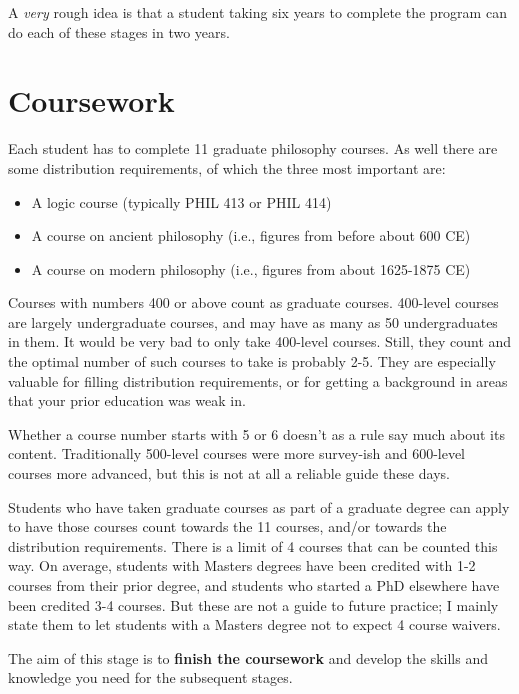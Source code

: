 \documentclass[]{book}
\providecommand{\tightlist}{%
  \setlength{\itemsep}{0pt}\setlength{\parskip}{0pt}}
\begin{document}
A \emph{very} rough idea is that a student taking six years to complete the program can do each of these stages in two years.

\hypertarget{coursework}{%
\section{Coursework}\label{coursework}}

Each student has to complete 11 graduate philosophy courses. As well there are some distribution requirements, of which the three most important are:

\begin{itemize}
\tightlist
\item
  A logic course (typically PHIL 413 or PHIL 414)
\item
  A course on ancient philosophy (i.e., figures from before about 600 CE)
\item
  A course on modern philosophy (i.e., figures from about 1625-1875 CE)
\end{itemize}

Courses with numbers 400 or above count as graduate courses. 400-level courses are largely undergraduate courses, and may have as many as 50 undergraduates in them. It would be very bad to only take 400-level courses. Still, they count and the optimal number of such courses to take is probably 2-5. They are especially valuable for filling distribution requirements, or for getting a background in areas that your prior education was weak in.

Whether a course number starts with 5 or 6 doesn't as a rule say much about its content. Traditionally 500-level courses were more survey-ish and 600-level courses more advanced, but this is not at all a reliable guide these days.

Students who have taken graduate courses as part of a graduate degree can apply to have those courses count towards the 11 courses, and/or towards the distribution requirements. There is a limit of 4 courses that can be counted this way. On average, students with Masters degrees have been credited with 1-2 courses from their prior degree, and students who started a PhD elsewhere have been credited 3-4 courses. But these are not a guide to future practice; I mainly state them to let students with a Masters degree not to expect 4 course waivers.

The aim of this stage is to \textbf{finish the coursework} and develop the skills and knowledge you need for the subsequent stages.
\end{document}
